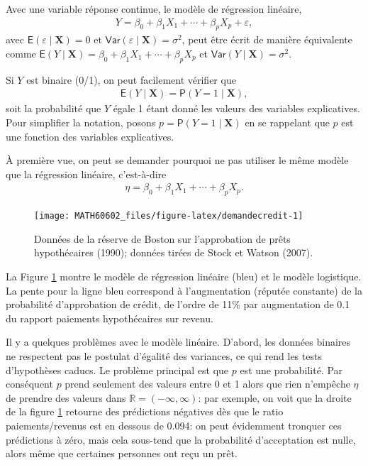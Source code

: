 \documentclass[
  11pt,
  letterpaper,
]{book}
\theoremstyle{definition}
\theoremstyle{definition}
\theoremstyle{definition}
\theoremstyle{definition}
\theoremstyle{remark}
\begin{document}
Avec une variable réponse continue, le modèle de régression linéaire,
\begin{align*}
 Y = \beta_0 + \beta_1X_1 + \cdots + \beta_p X_p + \varepsilon,
\end{align*}
avec \({\mathsf E}\left(\varepsilon\mid \boldsymbol{X}\right)=0\) et \({\mathsf{Var}}\left(\varepsilon\mid \boldsymbol{X}\right)=\sigma^2\), peut être écrit de manière équivalente comme \({\mathsf E}\left(Y \mid \boldsymbol{X}\right) = \beta_0 + \beta_1X_1 + \cdots + \beta_pX_p\) et \({\mathsf{Var}}\left(Y \mid \boldsymbol{X}\right)=\sigma^2.\)

Si \(Y\) est binaire (0/1), on peut facilement vérifier que
\begin{align*}
{\mathsf E}\left(Y \mid \boldsymbol{X}\right) = {\mathsf P}\left(Y=1 \mid  \boldsymbol{X}\right),
\end{align*}
soit la probabilité que \(Y\) égale 1 étant donné les valeurs des variables explicatives. Pour simplifier la notation, posons \(p = {\mathsf P}\left(Y=1 \mid \boldsymbol{X}\right)\) en se rappelant que \(p\) est une fonction des variables explicatives.

À première vue, on peut se demander pourquoi ne pas utiliser le même modèle que la régression linéaire, c'est-à-dire
\begin{align*}
\eta=\beta_0 + \beta_1X_1 + \cdots + \beta_p X_p.
\end{align*}

\begin{figure}

{\centering \texttt{[image: MATH60602\_files/figure-latex/demandecredit-1]} 

}

\caption{Données de la réserve de Boston sur l'approbation de prêts hypothécaires (1990); données tirées de Stock et Watson (2007).}\label{fig:demandecredit}
\end{figure}

La Figure \ref{fig:demandecredit} montre le modèle de régression linéaire (bleu) et le modèle logistique. La pente pour la ligne bleu correspond à l'augmentation (réputée constante) de la probabilité d'approbation de crédit, de l'ordre de 11\% par augmentation de 0.1 du rapport paiements hypothécaires sur revenu.

Il y a quelques problèmes avec le modèle linéaire. D'abord, les données binaires ne respectent pas le postulat d'égalité des variances, ce qui rend les tests d'hypothèses caducs.
Le problème principal est que \(p\) est une probabilité. Par conséquent \(p\) prend seulement des valeurs entre 0 et 1 alors que rien n'empêche \(\eta\) de prendre des valeurs dans \(\mathbb{R}=(-\infty, \infty)\): par exemple, on voit que la droite de la figure \ref{fig:demandecredit} retourne des prédictions négatives dès que le ratio paiements/revenus est en dessous de 0.094: on peut évidemment tronquer ces prédictions à zéro, mais cela sous-tend que la probabilité d'acceptation est nulle, alors même que certaines personnes ont reçu un prêt.
\end{document}
